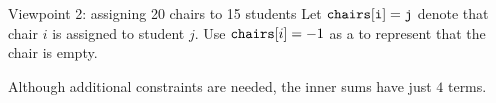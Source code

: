\documentclass{cons-beamer}
\begin{document}
\begin{frame}[fragile]{Viewpoint 2: assigning 20 chairs to 15 students}
  Let $\mathtt{\mathtt{chairs}[i] = j}$ denote that chair $i$ is assigned to student $j$.
  \pause
  Use $\mathtt{chairs}[i]=-1$ as a  to represent that the chair is empty.

  \parBreak

  \lstset{aboveskip=0pt,belowskip=0pt}
  
  \pause
  
  \pause
  
  \pause
  
  \pause
  \normalsize


  \parBreak
  Although additional constraints are needed, the inner sums have just $4$ terms.
\end{frame}
\end{document}
